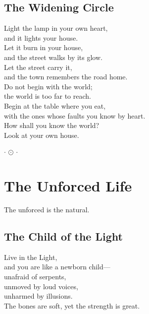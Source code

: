 \documentclass[10pt, openright]{book}
\newcommand{\sectionbreak}{\filbreak}
\newcommand{\sayingsource}[1]{\par\nopagebreak\vspace{0.3\baselineskip}{\raggedleft\footnotesize\itshape #1\par}}
\newcommand{\ornament}{
    \vspace{1.5cm}
    \begin{center}
        \large \(\cdot\) \(\odot\) \(\cdot\)
    \end{center}
    \vspace{1.5cm}
}
\begin{document}
\sayingsource{Tao Te Ching 53 · Mark 10:25 · Matthew 7:13--14}

\sectionbreak

\section{The Widening Circle}\label{the-widening-circle}

Light the lamp in your own heart,\\
and it lights your house.\\
Let it burn in your house,\\
and the street walks by its glow.\\
Let the street carry it,\\
and the town remembers the road home.\\
Do not begin with the world;\\
the world is too far to reach.\\
Begin at the table where you eat,\\
with the ones whose faults you know by heart.\\
How shall you know the world?\\
Look at your own house.

\sayingsource{Tao Te Ching 54 · Thomas 33 · Matthew 5:15}

\ornament

\chapter{The Unforced Life}\label{the-unforced-life}

\begin{center}
The unforced is the natural.
\end{center}

\sectionbreak

\section{The Child of the Light}\label{the-child-of-the-light}

Live in the Light,\\
and you are like a newborn child---\\
unafraid of serpents,\\
unmoved by loud voices,\\
unharmed by illusions.\\
The bones are soft, yet the strength is great.
\end{document}
